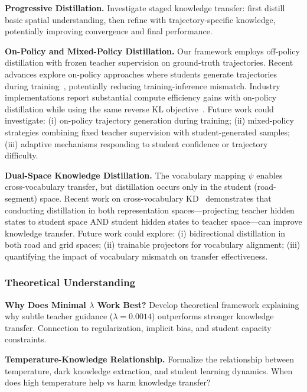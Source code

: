 \textbf{Progressive Distillation.} Investigate staged knowledge transfer: first distill basic spatial understanding, then refine with trajectory-specific knowledge, potentially improving convergence and final performance.

\textbf{On-Policy and Mixed-Policy Distillation.} Our framework employs off-policy distillation with frozen teacher supervision on ground-truth trajectories. Recent advances explore on-policy approaches where students generate trajectories during training~\cite{singhORPODistillMixedPolicyPreference2025,pengAdaSwitchAdaptiveSwitching2025}, potentially reducing training-inference mismatch. Industry implementations report substantial compute efficiency gains with on-policy distillation while using the same reverse KL objective~\cite{OnPolicyDistillation}. Future work could investigate: (i) on-policy trajectory generation during training; (ii) mixed-policy strategies combining fixed teacher supervision with student-generated samples; (iii) adaptive mechanisms responding to student confidence or trajectory difficulty.

\textbf{Dual-Space Knowledge Distillation.} The vocabulary mapping $\psi$ enables cross-vocabulary transfer, but distillation occurs only in the student (road-segment) space. Recent work on cross-vocabulary KD~\cite{zhangDualSpaceFrameworkGeneral2025} demonstrates that conducting distillation in both representation spaces—projecting teacher hidden states to student space AND student hidden states to teacher space—can improve knowledge transfer. Future work could explore: (i) bidirectional distillation in both road and grid spaces; (ii) trainable projectors for vocabulary alignment; (iii) quantifying the impact of vocabulary mismatch on transfer effectiveness.

\subsubsection{Theoretical Understanding}

\textbf{Why Does Minimal $\lambda$ Work Best?} Develop theoretical framework explaining why subtle teacher guidance ($\lambda = 0.0014$) outperforms stronger knowledge transfer. Connection to regularization, implicit bias, and student capacity constraints.

\textbf{Temperature-Knowledge Relationship.} Formalize the relationship between temperature, dark knowledge extraction, and student learning dynamics. When does high temperature help vs harm knowledge transfer?

